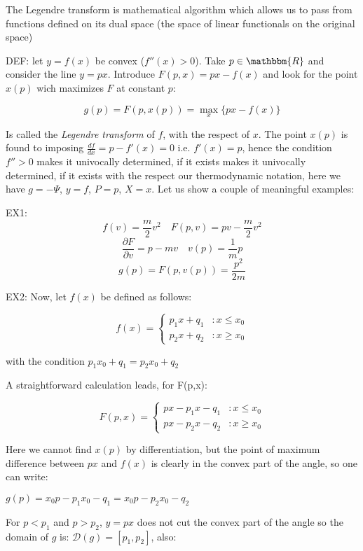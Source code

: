 \documentclass{article}
\begin{document}
The Legendre transform is mathematical algorithm which allows us to pass from functions defined on its dual space (the space of linear functionals on the original space)

DEF: let $y=f(x)$ be convex ($f''(x)>0$). Take $p \in \mathbbm{R}$ and consider the line $y=px$. Introduce $F(p,x)=px-f(x)$ and look for the point $x(p)$ wich maximizes $F$ at constant $p$:

$$g(p) = F(p,x(p)) = \max_{x} \{ px-f(x) \} $$

Is called the \emph{Legendre transform} of $f$, with the respect of $x$. 
The point $x(p)$ is found to imposing $\frac{df}{dx} = p - f'(x)=0$ i.e. $f'(x)=p$, hence the condition $f''>0$ makes it univocally determined, if it exists makes it univocally determined, if it exists with the respect our thermodynamic notation, here we have $g = - \Psi$, $y=f$, $P=p$, $X=x$.
Let us show a couple of meaningful examples:

EX1: 
$$f(v) = \frac{m}{2}v^2 \quad F(p,v) = pv -  \frac{m}{2}v^2$$ 
$$\frac{\partial F}{\partial v} = p-mv \quad v(p)=\frac{1}{m}p $$
$$g(p) = F(p,v(p)) = \frac{p^2}{2m}$$

EX2:
Now, let $f(x)$ be defined as follows:

\begin{displaymath}
	f(x) = \left\{
	\begin{array}{lr}
		p_1x+q_1 & : x \leq x_0\\
		p_2x+q_2 & : x \geq x_0
	\end{array}
	\right.
\end{displaymath}

with the condition $p_1 x_0 + q_1 = p_2 x_0 + q_2$

A straightforward calculation leads, for F(p,x):

\begin{displaymath}
F(p,x) = \left\{
\begin{array}{lr}
px - p_1x - q_1 & : x \leq x_0\\
px - p_2x - q_2 & : x \geq x_0
\end{array}
\right.
\end{displaymath}

Here we cannot find $x(p)$ by differentiation, but the point of maximum difference between $px$ and $f(x)$ is clearly in the convex part of the angle, so one can write:

$g(p) = x_0p -p_1 x_0 - q_1 = x_0 p - p_2 x_0 - q_2$

For $p<p_1$ and $p>p_2$, $y=px$ does not cut the convex part of the angle so the domain of $g$ is: $\mathcal{D}(g) = [p_1,p_2]$, also:
\end{document}

